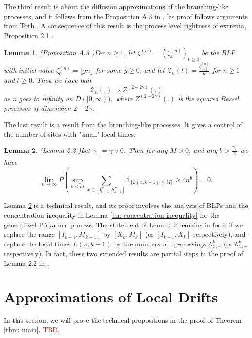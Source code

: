 \documentclass[twoside,12pt,a4paper]{article}
\newtheorem{lemma}{Lemma}[section]
\numberwithin{equation}{section}
\newcommand\TBD{\textcolor{red}{TBD.}}
\begin{document}
		The third result is about the diffusion approximations of the branching-like processes, and it follows from the Proposition A.3 in \cite{KMP22}. Its proof follows arguments from Toth \cite{T96}. A consequence of this result is the process level tightness of extrema, Proposition 2.1 \cite{KMP22}. 
		
		\begin{lemma}(Proposition A.3 \cite{KMP22})\label{lm: diffusion approximation of blp}
			For $n\geq 1$, let $\zeta^{(n)}=(\zeta^{(n)}_k)_{k\geq 0 }  $ be the BLP with initial value $\zeta^{(n)}_0 = \lfloor yn \rfloor$ for some $y \geq 0$, and let $\mathcal{Z}_n(t) = \frac{\zeta^{(n)}_{\lfloor nt \rfloor}}{n}$ for $n\geq 1$ and $t\geq 0$. Then we have that 
			$$
			\mathcal{Z}_n(.) \Longrightarrow Z^{(2-2\gamma)}(.)
			$$ as $n$ goes to infinity on $D([0,\infty)),$ where $Z^{(2-2\gamma)}(.)$ is the squared Bessel processes of dimension $2-2\gamma$.
		\end{lemma}

		
		The last result is a result from the branching-like processes. It gives a control of the number of sites with "small" local times:
		\begin{lemma}(Lemma 2.2 \cite{KMP22})\label{lm: number of rarely visit sites}
			Let $\gamma_+ = \gamma \vee 0$. Then for any $M>0$, and any $b>\frac{\gamma_+}{2}$ we have
			$$
			\lim_{n\to\infty} P\left(\sup_{k\leq nt}  \sum_{x\in [I^X_{k-1}, S^X_{k-1}]} \mathbb{1}_{\{ L(x,k-1) \leq M \}} \geq 4n^b \right) = 0.
			$$
			
		\end{lemma}	
		Lemma \ref{lm: number of rarely visit sites} is a technical result, and its proof involves the analysis of BLPs and the concentration inequality in Lemma \ref{lm: concentration inequality} for the generalized P\'{o}lya urn process. The statement of Lemma \ref{lm: number of rarely visit sites} remains in force if we replace the range $[I_{k-1}, M_{k-1}]$ by $[X_k,M_k]$ (or $[I_{k-1},X_k]$ respectively), and replace the local times $L(x,k-1)$ by the numbers of up-crossings $\mathcal{E}^{k}_{x,+}$ (or $\mathcal{E}^{k}_{x,-}$ respectively). In fact, these two extended results are partial steps in the proof of Lemma 2.2 in \cite{KMP22}.   
		
		
		\section{Approximations of Local Drifts}\label{sec: approximations}
		In this section, we will prove the technical propositions in the proof of Theorem \ref{thm: main}. \TBD
		
\end{document}

